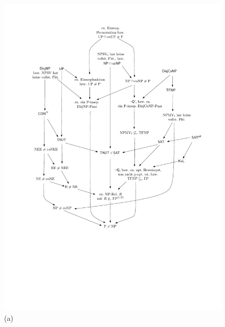 \begin{figure}[t]
    \centering\includegraphics[page=3]{figures.pdf}\\\smallskip
    (a)\bigskip


\end{figure}
